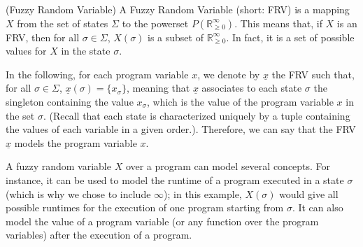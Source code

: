 \documentclass[a4paper,10pt]{llncs}
\def\RRposi {{\mathbb R_{\geq 0}^{\infty}}}
\begin{document}
\begin{definition}{\textnormal{(Fuzzy Random Variable)\newline}}
 A Fuzzy Random Variable (short: FRV) is a mapping $X$ from the set of states $\Sigma$ to the powerset $P(\RRposi)$. This means that, if $X$ is an FRV, then for all $\sigma \in \Sigma$, $X(\sigma)$ is a subset of $\RRposi$. In fact, it is a set of possible values for $X$ in the state $\sigma$.
\end{definition}
\begin{example}
 In the following, for each program variable $x$, we denote by $\underline{x}$ the FRV such that, for all $\sigma \in \Sigma$, $\underline{x}(\sigma) = \{ x_{\sigma} \}$, meaning that $\underline{x}$ associates to each state $\sigma$ the singleton containing the value $x_\sigma$, which is the value of the program variable $x$ in the set $\sigma$. (Recall that each state is characterized uniquely by a tuple containing the values of each variable in a given order.). Therefore, we can say that the FRV $\underline{x}$ models the program variable $x$.
\end{example}

A fuzzy random variable $X$ over a program can model several concepts. For instance, it can be used to model the runtime of a program executed in a state $\sigma$ (which is why we chose to include $\infty$); in this example, $X(\sigma)$ would give all possible runtimes for the execution of one program starting from $\sigma$. It can also model the value of a program variable (or any function over the program variables) after the execution of a program.\newline
\end{document}
